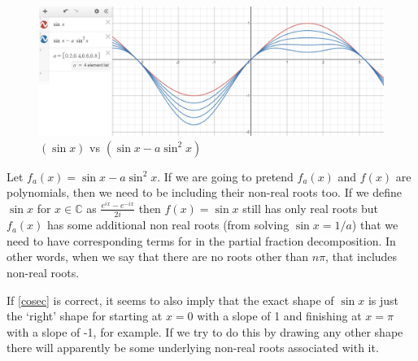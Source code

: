 \documentclass{article}
\begin{document}
\begin{figure}[h]
    \centering
    \includegraphics[scale=0.35]{sinx.png}
    \caption{$(\sin x)$ vs $(\sin x - a \sin^2 x)$}
\end{figure}

Let $f_a(x) = \sin x - a\sin^2 x$. If we are going to pretend $f_a(x)$ and $f(x)$ are polynomials, then we need to be including their non-real roots too. If we define $\sin x$ for $x \in \mathbb{C}$ as $\frac{e^{ix}-e^{-ix}}{2i}$ then $f(x) = \sin x$ still has only real roots but $f_a(x)$ has some additional non real roots (from solving $\sin x = 1/a$) that we need to have corresponding terms for in the partial fraction decomposition. In other words, when we say that there are no roots other than $n \pi$, that includes non-real roots. 

\begin{tcolorbox}
If \eqref{cosec} is correct, it seems to also imply that the exact shape of $\sin x$ is just the `right' shape for starting at $x=0$ with a slope of 1 and finishing at $x=\pi$ with a slope of -1, for example. If we try to do this by drawing any other shape there will apparently be some underlying non-real roots associated with it.
\end{tcolorbox}
\end{document}
